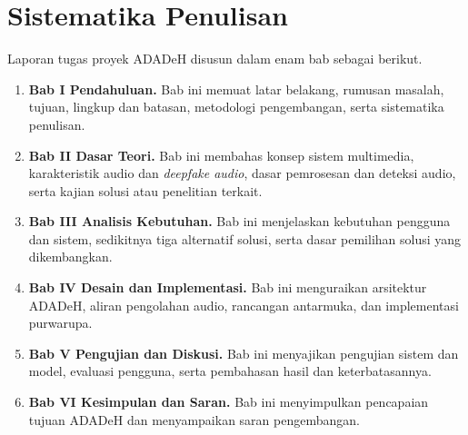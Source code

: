 \section{Sistematika Penulisan}
Laporan tugas proyek ADADeH disusun dalam enam bab sebagai berikut.
\begin{enumerate}
\item \textbf{Bab I Pendahuluan.} Bab ini memuat latar belakang, rumusan masalah, tujuan, lingkup dan batasan, metodologi pengembangan, serta sistematika penulisan.
\item \textbf{Bab II Dasar Teori.} Bab ini membahas konsep sistem multimedia, karakteristik audio dan \textit{deepfake audio}, dasar pemrosesan dan deteksi audio, serta kajian solusi atau penelitian terkait.
\item \textbf{Bab III Analisis Kebutuhan.} Bab ini menjelaskan kebutuhan pengguna dan sistem, sedikitnya tiga alternatif solusi, serta dasar pemilihan solusi yang dikembangkan.
\item \textbf{Bab IV Desain dan Implementasi.} Bab ini menguraikan arsitektur ADADeH, aliran pengolahan audio, rancangan antarmuka, dan implementasi purwarupa.
\item \textbf{Bab V Pengujian dan Diskusi.} Bab ini menyajikan pengujian sistem dan model, evaluasi pengguna, serta pembahasan hasil dan keterbatasannya.
\item \textbf{Bab VI Kesimpulan dan Saran.} Bab ini menyimpulkan pencapaian tujuan ADADeH dan menyampaikan saran pengembangan.
\end{enumerate}

